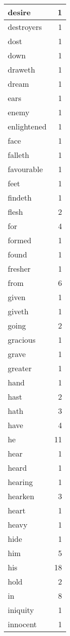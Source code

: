 \begin{center}
\begin{longtable}{l|r}
desire & 1 \\ \hline
destroyers & 1 \\ \hline
dost & 1 \\ \hline
down & 1 \\ \hline
draweth & 1 \\ \hline
dream & 1 \\ \hline
ears & 1 \\ \hline
enemy & 1 \\ \hline
enlightened & 1 \\ \hline
face & 1 \\ \hline
falleth & 1 \\ \hline
favourable & 1 \\ \hline
feet & 1 \\ \hline
findeth & 1 \\ \hline
flesh & 2 \\ \hline
for & 4 \\ \hline
formed & 1 \\ \hline
found & 1 \\ \hline
fresher & 1 \\ \hline
from & 6 \\ \hline
given & 1 \\ \hline
giveth & 1 \\ \hline
going & 2 \\ \hline
gracious & 1 \\ \hline
grave & 1 \\ \hline
greater & 1 \\ \hline
hand & 1 \\ \hline
hast & 2 \\ \hline
hath & 3 \\ \hline
have & 4 \\ \hline
he & 11 \\ \hline
hear & 1 \\ \hline
heard & 1 \\ \hline
hearing & 1 \\ \hline
hearken & 3 \\ \hline
heart & 1 \\ \hline
heavy & 1 \\ \hline
hide & 1 \\ \hline
him & 5 \\ \hline
his & 18 \\ \hline
hold & 2 \\ \hline
in & 8 \\ \hline
iniquity & 1 \\ \hline
innocent & 1 \\ \hline

\end{longtable}
\end{center}
